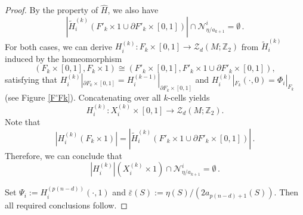 \documentclass[10pt,a4paper]{amsart}
\begin{document}
\begin{proof}
By the property of $\hat H$, we also have
\begin{equation*}
    |\tilde H^{(k)}_i(F'_k \times 1 \cup \partial F'_k \times [0, 1])| \cap \mathcal{N}^i_{\eta / a_{k + 1}} = \emptyset\,.
\end{equation*}
For both cases, we can derive $H^{(k)}_i: F_k \times [0, 1] \rightarrow \mathcal{Z}_d(M; \mathbb{Z}_2)$ from $\tilde{H}^{(k)}_i$ induced by the homeomorphism 
\begin{equation*}
    (F_k \times [0,1], F_k \times 1) \cong (F'_k \times [0,1], F'_k \times 1 \cup \partial F'_k \times [0,1]),
\end{equation*}
satisfying that $H^{(k)}_i|_{\partial F_k \times [0,1]} = H^{(k-1)}_i|_{\partial F_k \times [0,1]}$ and $H^{(k)}_i|_{F_k}(\cdot, 0) = \Phi_i|_{F_k}$ (see Figure \ref{F'Fk}). Concatenating over all \(k\)-cells yields
\begin{equation*}
    H^{(k)}_i: X^{(k)}_i \times [0,1] \rightarrow \mathcal{Z}_d(M; \mathbb{Z}_2).
\end{equation*}
Note that
\begin{equation*}
    |H^{(k)}_i(F_k \times 1)| = |\tilde H^{(k)}_i(F'_k \times 1 \cup \partial F'_k \times [0, 1])|\,.   
\end{equation*}
Therefore, we can conclude that
\begin{equation*}
    |H^{(k)}_i|(X^{(k)}_i \times 1) \cap \mathcal{N}^i_{\eta / a_{k+1}} = \emptyset\,.
\end{equation*}

Set \(\Psi_i:=H_i^{(p(n-d))}(\cdot,1)\) and \(\bar\varepsilon(S):=\eta(S)/(2a_{p(n-d)+1}(S))\). Then all required conclusions follow.
\end{proof}
\end{document}
